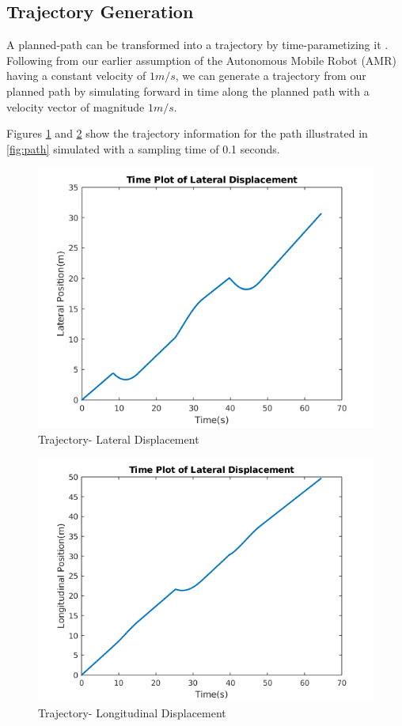 \documentclass[a4paper, twocolumn]{article}
\begin{document}
\subsection{Trajectory Generation}

A planned-path can be transformed into a trajectory by time-parametizing it \cite{roesmann1}. 
Following from our earlier assumption of the Autonomous Mobile Robot (AMR) having a constant velocity of $1m/s$, 
we can generate a trajectory from our planned path by simulating forward in time along the planned path with a velocity 
vector of magnitude $1m/s$.

\noindent
Figures \ref{fig:traj_lat} and \ref{fig:traj_lon} show the trajectory information for the path illustrated in \ref{fig:path} simulated with a 
sampling time of 0.1 seconds.


\begin{figure}
    \centering
    \includegraphics[scale=.45]{presentation/img/traj_lat.png}
    \caption{Trajectory- Lateral Displacement}
    \label{fig:traj_lat}
\end{figure}

\begin{figure}
    \centering
    \includegraphics[scale=.45]{presentation/img/traj_lon.png}
    \caption{Trajectory- Longitudinal Displacement}
    \label{fig:traj_lon}
\end{figure}
\end{document}
